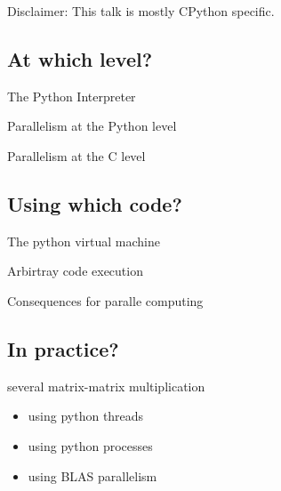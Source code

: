 \documentclass[14pt, usenames,dvipsnames]{beamer} %
\begin{document}
    \begin{frame}[t]{}
        \center
        \vspace{3em}
        \tableofcontents[
            subsectionstyle=show/hide/hide,
            sectionstyle=show/hide
            ]
    \end{frame}
    \begin{frame}[t]{}
        \vspace{5em}
        \center Disclaimer: This talk is mostly CPython specific.
    \end{frame}

    \subsection{At which level?}
        \begin{frame}[t]{The Python Interpreter}

        \end{frame}
        \begin{frame}[t]{Parallelism at the Python level}

        \end{frame}
        \begin{frame}[t]{Parallelism at the C level}

        \end{frame}
    \subsection{Using which code?}
        \begin{frame}[t]{The python virtual machine}

        \end{frame}
        \begin{frame}[t]{Arbirtray code execution}

        \end{frame}
        \begin{frame}[t]{Consequences for paralle computing}

        \end{frame}
    \subsection{In practice?}
        \begin{frame}[t]{several matrix-matrix multiplication}
            \begin{itemize}
                \item using python threads
                \item using python processes
                \item using BLAS parallelism
            \end{itemize}
        \end{frame}
\end{document}
